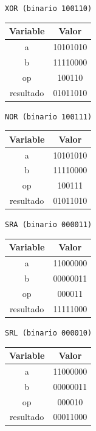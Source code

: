 \documentclass[letterpaper]{sae}
\begin{document}
\vspace{5 mm}

\verb+XOR (binario 100110)+\\

\begin{center}
	\begin{tabular}{|c|c|}
		\hline 
		Variable & Valor\tabularnewline
		\hline 
		\hline 
		a & 10101010\tabularnewline
		\hline 
		b & 11110000\tabularnewline
		\hline 
		op & 100110\tabularnewline
		\hline 
		resultado & 01011010\tabularnewline
		\hline 
	\end{tabular}
\end{center}

\vspace{5 mm}

\newpage

\verb+NOR (binario 100111)+\\

\begin{center}
	\begin{tabular}{|c|c|}
		\hline 
		Variable & Valor\tabularnewline
		\hline 
		\hline 
		a & 10101010\tabularnewline
		\hline 
		b & 11110000\tabularnewline
		\hline 
		op & 100111\tabularnewline
		\hline 
		resultado & 01011010\tabularnewline
		\hline 
	\end{tabular}
\end{center}

\vspace{5 mm}

\verb+SRA (binario 000011)+\\

\begin{center}
	\begin{tabular}{|c|c|}
		\hline 
		Variable & Valor\tabularnewline
		\hline 
		\hline 
		a & 11000000\tabularnewline
		\hline 
		b & 00000011\tabularnewline
		\hline 
		op & 000011\tabularnewline
		\hline 
		resultado & 11111000\tabularnewline
		\hline 
	\end{tabular}
\end{center}

\vspace{5 mm}

\verb+SRL (binario 000010)+\\

\begin{center}
	\begin{tabular}{|c|c|}
		\hline 
		Variable & Valor\tabularnewline
		\hline 
		\hline 
		a & 11000000\tabularnewline
		\hline 
		b & 00000011\tabularnewline
		\hline 
		op & 000010\tabularnewline
		\hline 
		resultado & 00011000\tabularnewline
		\hline 
	\end{tabular}
\end{center}
\end{document}
